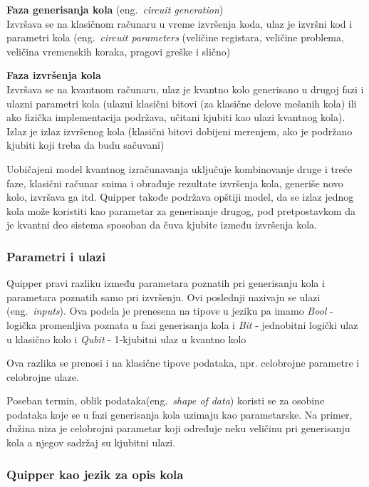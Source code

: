 \documentclass[a4paper]{article}
\begin{document}
{\textbf{Faza generisanja kola} (eng.~\emph{circuit generation})\\
Izvršava se na klasičnom računaru u vreme izvršenja koda, ulaz je izvršni kod i parametri kola (eng.~\emph{circuit parameters} (veličine registara, veličine problema, veličina vremenskih koraka, pragovi greške i slično)

\textbf{Faza izvršenja kola}\\
Izvršava se na kvantnom računaru, ulaz je kvantno kolo generisano u drugoj fazi i ulazni parametri kola (ulazni klasični bitovi (za klasične delove mešanih kola) ili ako fizička implementacija podržava, učitani kjubiti kao ulazi kvantnog kola). Izlaz je izlaz izvršenog kola (klasični bitovi dobijeni merenjem, ako je podržano kjubiti koji treba da budu sačuvani)

Uobičajeni model kvantnog izračunavanja uključuje kombinovanje druge i treće faze, klasični računar snima i obrađuje rezultate izvršenja kola, generiše novo kolo, izvršava ga itd. Quipper takođe podržava opštiji model, da se izlaz jednog kola može koristiti kao parametar za generisanje drugog, pod pretpostavkom da je kvantni deo sistema sposoban da čuva kjubite između izvršenja kola.

\subsubsection{Parametri i ulazi}

Quipper pravi razliku između parametara poznatih pri generisanju kola i parametara poznatih samo pri izvršenju. Ovi poslednji nazivaju se ulazi (eng.~\emph{inputs}). Ova podela je prenesena na tipove u jeziku pa imamo \emph{Bool} - logička promenljiva poznata u fazi generisanja kola i \emph{Bit} - jednobitni logički ulaz u klasično kolo i \emph{Qubit} - 1-kjubitni ulaz u kvantno kolo

Ova razlika se prenosi i na klasične tipove podataka, npr. celobrojne parametre i celobrojne ulaze.

Poseban termin, oblik podataka(eng.~\emph{shape of data}) koristi se za osobine podataka koje se u fazi generisanja kola uzimaju kao parametarske. Na primer, dužina niza je celobrojni parametar koji određuje neku veličinu pri generisanju kola a njegov sadržaj su kjubitni ulazi.

\pagebreak
\subsubsection{Quipper kao jezik za opis kola}

}
\end{document}
